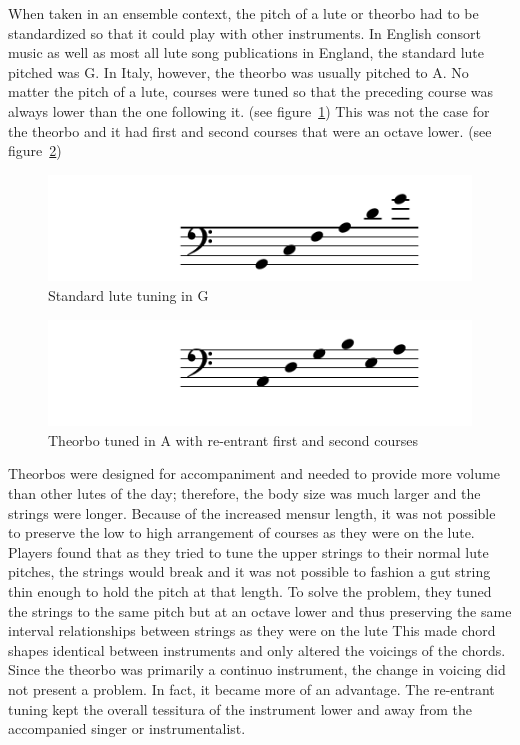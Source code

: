 When taken in an ensemble context, the pitch of a lute or theorbo had to be
standardized so that it could play with other instruments.  In English consort music as
well as most all lute song publications in England, the standard lute pitched was G.
In Italy, however, the theorbo was usually pitched to A.  No matter the pitch of a
lute, courses were tuned so that the preceding course was always lower than the one
following it. (see figure~\ref{g-lute})  This was not the case for the theorbo and it
had first and second courses that were an octave lower. (see figure~\ref{a-theorbo})

\begin{figure}[h]
\centering
\includegraphics{examples/lute-tuning.pdf}
\caption{Standard lute tuning in G}
\label{g-lute}
\end{figure}
\begin{figure}[h]
\centering
\includegraphics{examples/theorbo-tuning.pdf}
\caption{Theorbo tuned in A with re-entrant first and second courses}
\label{a-theorbo}
\end{figure}

Theorbos were designed for accompaniment and needed to provide more volume than other
lutes of the day; therefore, the body size was much larger and the strings were longer.
Because of the increased mensur length, it was not possible to preserve the low to high
arrangement of courses as they were on the lute. Players found that as they tried to tune
the upper strings to their normal lute pitches, the strings would break and it was not
possible to fashion a gut string thin enough to hold the pitch at that length.  To solve
the problem, they tuned the strings to the same pitch but at an octave lower and thus
preserving the same interval relationships between strings as they were on the lute  This
made chord shapes identical between instruments and only altered the voicings of the
chords. Since the theorbo was primarily a continuo instrument, the change in voicing did
not present a problem. In fact, it became more of an advantage.  The re-entrant tuning
kept the overall tessitura of the instrument lower and away from the accompanied singer or
instrumentalist.

